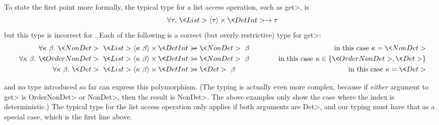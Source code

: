 To state the first point more formally, the 
typical type for a list access operation, such as \<get>, is
$$\forallt{\tau} \<List>\angles{\tau} \times \<Det Int> \rightarrow \tau$$
but this type is incorrect for \ourTypeSystem.  Each of the following is a
correct (but overly restrictive) type for \<get>:
\begin{eqnarray*}
\forallt{\kappa\ \beta} \<NonDet>\ \<List>\angles{\kappa\ \beta} \times \<Det Int>
& \strut\hspace{-1em} \rightarrow \<NonDet>\ \beta
& \mbox{\quad in this case $\kappa = \<NonDet>$} \\
\forallt{\kappa\ \beta} \<OrderNonDet>\ \<List>\angles{\kappa\ \beta} \times \<Det Int>
& \strut\hspace{-1em} \rightarrow \<NonDet>\ \beta
& \mbox{\quad in this case $\kappa \in \{ \<OrderNonDet>, \<Det> \} $} \\
\forallt{\kappa\ \beta} \<Det>\ \<List>\angles{\kappa\ \beta} \times \<Det Int>
& \strut\hspace{-1em} \rightarrow \<Det>\ \beta\phantom{\<Non>}
& \mbox{\quad in this case $\kappa = \<Det>$}
\end{eqnarray*}

\noindent
and no type introduced so far can express this polymorphism.
(The typing is actually even more complex, because if \emph{either}
argument to \<get> is \<OrderNonDet> or \<NonDet>, then the
result is \<NonDet>.  The above examples only show the case where the index
is deterministic.)
The typical type for the list access operation only applies if both
arguments are \<Det>,
and our typing must have that as a special case, which is the first line above.






